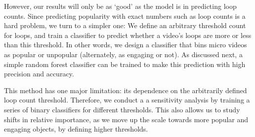 However, our results will only be as `good' as the model is in predicting loop counts. Since predicting popularity with exact numbers such as loop counts is a hard problem, we turn to a simpler one: We define an arbitrary threshold count for loops, and train a classifier to predict whether a video's loops are more or less than this threshold. In other words, we design a classifier that bins micro videos as popular or unpopular (alternately, as engaging or not). As discussed next, a simple random forest classifier can be trained to make this prediction with high precision and accuracy. 

This method has one major limitation: its dependence on the arbitrarily defined loop count threshold. Therefore, we conduct a a sensitivity analysis by training a series of binary classifiers for different thresholds. This also allows us to study shifts in relative importance, as we move up the scale towards more popular and engaging objects, by defining higher thresholds. 
%
%
